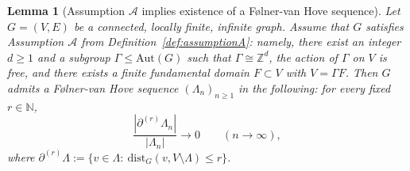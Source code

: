 \documentclass[10pt,a4paper]{amsart}
\newtheorem{lemma}{Lemma}
\begin{document}
\begin{lemma}[Assumption $\mathcal{A}$ implies existence of a F\o lner-van Hove sequence]\label{lem:P_implies_vanhove}
Let $G=(V,E)$ be a connected, locally finite, infinite graph. Assume that $G$ satisfies
Assumption $\mathcal{A}$ from Definition~\ref{def:assumptionA}: namely, there exist an integer $d\ge 1$
and a subgroup $\Gamma\le \mathrm{Aut}(G)$ such that $\Gamma\cong \mathbb{Z}^d$, the action of $\Gamma$
on $V$ is free, and there exists a finite fundamental domain $F\subset V$ with $V=\Gamma F$.
Then $G$ admits a F\o lner-van Hove sequence $(\Lambda_n)_{n\ge 1}$ in the following:
for every fixed $r\in\mathbb{N}$,
\[
\frac{|\partial^{(r)}\Lambda_n|}{|\Lambda_n|}\longrightarrow 0 \qquad (n\to\infty),
\]
where $\partial^{(r)}\Lambda:=\{v\in \Lambda:\ \mathrm{dist}_G(v,V\setminus \Lambda)\le r\}$.
\end{lemma}
\end{document}
